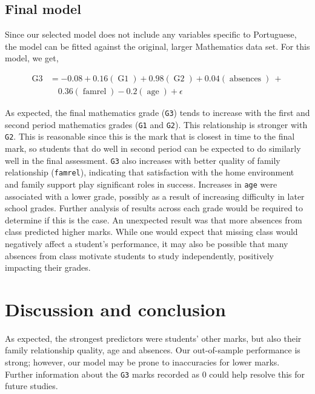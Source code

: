 \documentclass[a4paper,9pt,twocolumn,twoside,]{pinp}
\begin{document}
\hypertarget{final-model}{%
\subsection{Final model}\label{final-model}}

Since our selected model does not include any variables specific to
Portuguese, the model can be fitted against the original, larger
Mathematics data set. For this model, we get,

\[
\begin{aligned}
\operatorname{G3} &= -0.08 + 0.16(\operatorname{G1}) + 0.98(\operatorname{G2}) + 0.04(\operatorname{absences})\ + \\
&\quad 0.36(\operatorname{famrel}) - 0.2(\operatorname{age}) + \epsilon
\end{aligned}
\]

As expected, the final mathematics grade (\texttt{G3}) tends to increase
with the first and second period mathematics grades (\texttt{G1} and
\texttt{G2}). This relationship is stronger with \texttt{G2}. This is
reasonable since this is the mark that is closest in time to the final
mark, so students that do well in second period can be expected to do
similarly well in the final assessment. \texttt{G3} also increases with
better quality of family relationship (\texttt{famrel}), indicating that
satisfaction with the home environment and family support play
significant roles in success. Increases in \texttt{age} were associated
with a lower grade, possibly as a result of increasing difficulty in
later school grades. Further analysis of results across each grade would
be required to determine if this is the case. An unexpected result was
that more absences from class predicted higher marks. While one would
expect that missing class would negatively affect a student's
performance, it may also be possible that many absences from class
motivate students to study independently, positively impacting their
grades.

\hypertarget{discussion-and-conclusion}{%
\section{Discussion and conclusion}\label{discussion-and-conclusion}}

As expected, the strongest predictors were students' other marks, but
also their family relationship quality, age and absences. Our
out-of-sample performance is strong; however, our model may be prone to
inaccuracies for lower marks. Further information about the \texttt{G3}
marks recorded as 0 could help resolve this for future studies.
\end{document}
